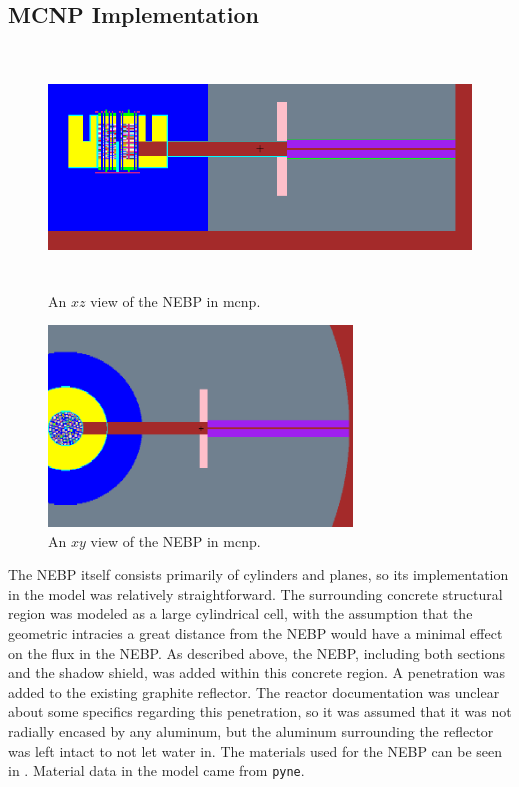 \subsection{MCNP Implementation}

\begin{figure}[htb]
\centering
\includegraphics[height=2.5in]{tex/figures/mcnp_newxz.png}
\caption[MCNP NEBP $XZ$]{An $xz$ view of the NEBP in mcnp.}
\label{fig:mcnp_newxz}
\end{figure}

\begin{figure}[htb]
\centering
\includegraphics[trim={0 1.5in 0 1.7in}, clip, height=2.1in]{tex/figures/mcnp_newxy.png}
\caption[MCNP NEBP $XY$]{An $xy$ view of the NEBP in mcnp.}
\label{fig:mcnp_newxy}
\end{figure}


The NEBP itself consists primarily of cylinders and planes, so its implementation in the model was relatively straightforward.
The surrounding concrete structural region was modeled as a large cylindrical cell, with the assumption that the geometric intracies a great distance from the NEBP would have a minimal effect on the flux in the NEBP.
As described above, the NEBP, including both sections and the shadow shield, was added within this concrete region.
A penetration was added to the existing graphite reflector.
The reactor documentation was unclear about some specifics regarding this penetration, so it was assumed that it was not radially encased by any aluminum, but the aluminum surrounding the reflector was left intact to not let water in.
The materials used for the NEBP can be seen in .
Material data in the model came from {\tt pyne}.


